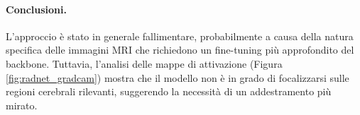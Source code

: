 \begin{table}[h!]
\centering

\begin{minipage}[t]{0.48\textwidth}
\centering
{}
\caption{Classification report del classificatore MLP addestrato su feature RadNet-50.}
\label{tab:radnet_mlp_best_report}
\end{minipage}
\hfill
\begin{minipage}[t]{0.48\textwidth}
\centering
{}
\caption{Confusion matrix del classificatore MLP su feature RadNet-50.}
\label{tab:radnet_mlp_best_cm}
\end{minipage}

\end{table}

\paragraph{Conclusioni.}
L'approccio è stato in generale fallimentare, probabilmente a causa della natura specifica delle immagini MRI che richiedono un fine-tuning più approfondito del backbone. Tuttavia, l'analisi delle mappe di attivazione (Figura \ref{fig:radnet_gradcam}) mostra che il modello non è in grado di focalizzarsi sulle regioni cerebrali rilevanti, suggerendo la necessità di un addestramento più mirato.

